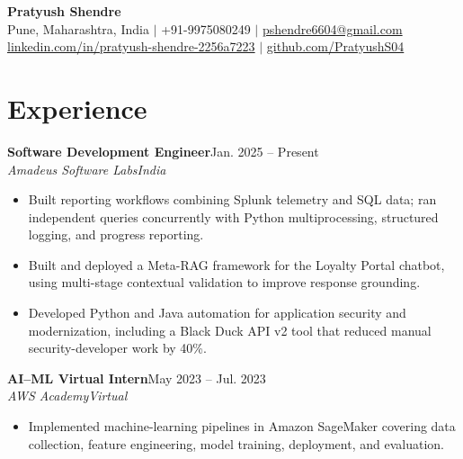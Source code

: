 \documentclass[a4paper,10pt]{article}
\newcommand{\role}[4]{\textbf{#1}\hfill #2\\\textit{#3}\hfill\textit{#4}\par}
\begin{document}
\begin{center}
{\Large\bfseries Pratyush Shendre}\\[3pt]
Pune, Maharashtra, India $|$ +91-9975080249 $|$ \href{mailto:pshendre6604@gmail.com}{pshendre6604@gmail.com}\\[1pt]
\href{https://linkedin.com/in/pratyush-shendre-2256a7223/}{linkedin.com/in/pratyush-shendre-2256a7223} $|$ \href{https://github.com/PratyushS04}{github.com/PratyushS04}
\end{center}

\section{Experience}
\role{Software Development Engineer}{Jan. 2025 -- Present}{Amadeus Software Labs}{India}
\begin{itemize}
\item Built reporting workflows combining Splunk telemetry and SQL data; ran independent queries concurrently with Python multiprocessing, structured logging, and progress reporting.
\item Built and deployed a Meta-RAG framework for the Loyalty Portal chatbot, using multi-stage contextual validation to improve response grounding.
\item Developed Python and Java automation for application security and modernization, including a Black Duck API v2 tool that reduced manual security-developer work by 40\%.
\end{itemize}
\role{AI--ML Virtual Intern}{May 2023 -- Jul. 2023}{AWS Academy}{Virtual}
\begin{itemize}
\item Implemented machine-learning pipelines in Amazon SageMaker covering data collection, feature engineering, model training, deployment, and evaluation.
\end{itemize}
\end{document}
